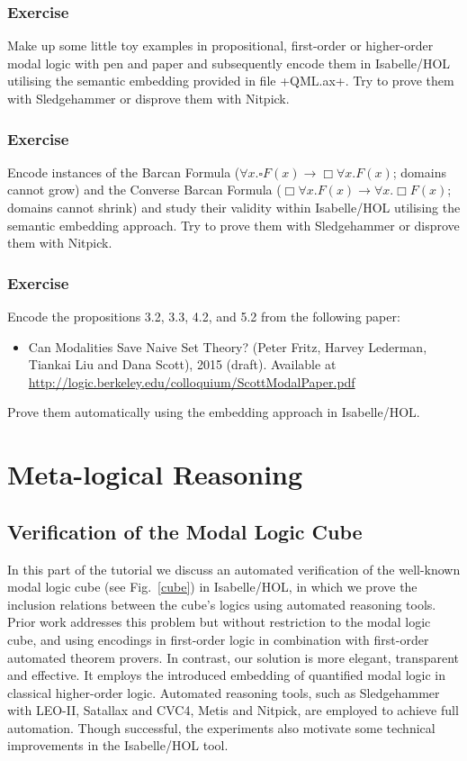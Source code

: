 \documentclass{article}
\begin{document}
\subsubsection{Exercise}
Make up some little toy examples in propositional, first-order or
higher-order modal logic with pen and paper and subsequently
encode them in Isabelle/HOL utilising the semantic embedding provided in 
file +QML.ax+. Try to prove them with Sledgehammer or disprove them
with Nitpick.

\subsubsection{Exercise}
Encode instances of the Barcan Formula ($\forall x. \square F(x)
\longrightarrow \Box \forall x. F(x)$; domains cannot grow) and the Converse Barcan
Formula ($\Box \forall x. F(x) \longrightarrow \forall x. \Box F(x)$; domains cannot shrink)
and study their validity within Isabelle/HOL utilising the semantic
embedding approach. Try to prove them with Sledgehammer or disprove them
with Nitpick.


\subsubsection{Exercise}
Encode the propositions 3.2, 3.3, 4.2, and 5.2 from the
following paper:
\begin{itemize}
\item Can Modalities Save Naive Set Theory? (Peter Fritz, Harvey
  Lederman, Tiankai Liu and Dana Scott), 2015 (draft). Available at \href{http://logic.berkeley.edu/colloquium/ScottModalPaper.pdf}{http://logic.berkeley.edu/colloquium/ScottModalPaper.pdf}
\end{itemize}
Prove them automatically using the embedding approach in Isabelle/HOL.



\section{Meta-logical Reasoning}

\subsection{Verification of the Modal Logic Cube}
In this part of the tutorial we discuss an automated verification of
the well-known modal logic cube (see Fig.~\ref{cube})
in Isabelle/HOL, in which we prove the
inclusion relations between the cube’s logics using automated
reasoning tools. Prior work addresses this problem but without
restriction to the modal logic cube, and using encodings in
first-order logic in combination with first-order automated theorem
provers. In contrast, our solution is more elegant, transparent and
effective. It employs the introduced embedding of quantified modal logic in
classical higher-order logic. Automated reasoning tools, such as
Sledgehammer with LEO-II, Satallax and CVC4, Metis and Nitpick, are
employed to achieve full automation. Though successful, the
experiments also motivate some technical improvements in the
Isabelle/HOL tool.
\end{document}
